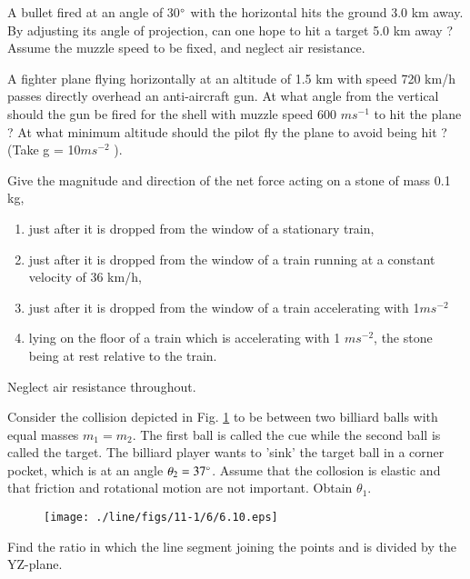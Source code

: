 \item A bullet fired at an angle of 30$\degree$ with the horizontal hits the ground 3.0 km away. By adjusting its angle of projection, can one hope to hit a target 5.0 km away ? Assume the muzzle speed to be fixed, and neglect air resistance.
\item  A fighter plane flying horizontally at an altitude of 1.5 km with speed 720 km/h passes directly overhead an anti-aircraft gun. At what angle from the vertical should the gun be fired for the shell with muzzle speed 600 $m s^{-1}$ to hit the plane ? 
At what minimum  altitude should the pilot fly the plane to avoid being hit ? (Take g = 10$ m s^{-2}$
).
\item Give the magnitude and direction of the net force acting on a stone of mass 0.1 kg, 
\begin{enumerate}
\item  just after it is dropped from the window of a stationary train, 
\item  just after it is dropped from the window of a train running at a constant velocity of 36 km/h,
\item  just after it is dropped from the window of a train accelerating with 1$ m s^{-2} $
\item  lying on the floor of a train which is accelerating with 1 $m s^{-2}$, the stone being at rest relative to the train.
\end{enumerate}
Neglect air resistance throughout. 

\item Consider the collision depicted in Fig. \ref{fig:6.10} to be between two billiard balls with equal masses $m_1= m_2$.  The first ball is called the cue while the second ball is called the target. The billiard player wants to 'sink' the target ball in a corner pocket, which is at an angle $\theta_2=37\degree$.  Assume that the collosion
is elastic and that friction and rotational motion are not important. Obtain $\theta_1$.
\begin{figure}[!ht]
\centering
\texttt{[image: ./line/figs/11-1/6/6.10.eps]}
\caption{}
\label{fig:6.10}
\end{figure}
%
\item Find the ratio in which the line segment joining the points  and  is divided by the YZ-plane.
%
%

